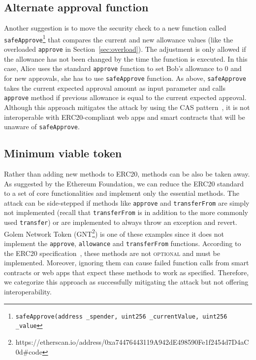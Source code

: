 
\subsection{Alternate approval function}

Another suggestion \cite{Ref16} is to move the security check to a new function called \texttt{safeApprove}\footnote{\texttt{safeApprove(address \_spender, uint256 \_currentValue, uint256 \_value}} that compares the current and new allowance values (like the overloaded \texttt{approve} in Section~\ref{sec:overload}). The adjustment is only allowed if the allowance has not been changed by the time the function is executed. In this case, Alice uses the standard \texttt{approve} function to set Bob’s allowance to 0 and for new approvals, she has to use \texttt{safeApprove} function. As above, \texttt{safeApprove} takes the current expected approval amount as input parameter and calls \texttt{approve} method if previous allowance is equal to the current expected approval. Although this approach mitigates the attack by using the CAS pattern~\cite{Ref06}, it is not interoperable with ERC20-compliant web apps and smart contracts that will be unaware of \texttt{safeApprove}.


\subsection{Minimum viable token}

Rather than adding new methods to ERC20, methods can be also be taken away. As suggested by the Ethereum Foundation\cite{Ref05}, we can reduce the ERC20 standard to a set of core functionalities and implement only the essential methods. The attack can be side-stepped if methods like \texttt{approve} and \texttt{transferFrom} are simply not implemented (recall that \texttt{transferFrom} is in addition to the more commonly used \texttt{transfer}) or are implemented to always throw an exception and revert. Golem Network Token (GNT\footnote{https://etherscan.io/address/0xa74476443119A942dE498590Fe1f2454d7\newline D4aC0d\#code}) is one of these examples since it does not implement the \texttt{approve}, \texttt{allowance} and \texttt{transferFrom} functions. According to the ERC20 specification~\cite{Ref08}, these methods are not \textsc{optional} and must be implemented. Moreover, ignoring them can cause failed function calls from smart contracts or web apps that expect these methods to work as specified. Therefore, we categorize this approach as successfully mitigating the attack but not offering interoperability.

